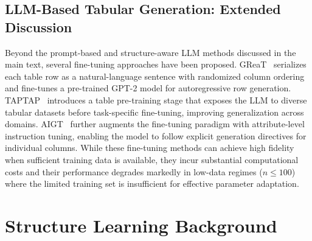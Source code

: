 \subsection{LLM-Based Tabular Generation: Extended Discussion}
Beyond the prompt-based and structure-aware LLM methods discussed in the main text, several fine-tuning approaches have been proposed. GReaT~\cite{borisov2023language} serializes each table row as a natural-language sentence with randomized column ordering and fine-tunes a pre-trained GPT-2 model for autoregressive row generation. TAPTAP~\cite{zhang2023generative} introduces a table pre-training stage that exposes the LLM to diverse tabular datasets before task-specific fine-tuning, improving generalization across domains. AIGT~\cite{zhang2025aigt} further augments the fine-tuning paradigm with attribute-level instruction tuning, enabling the model to follow explicit generation directives for individual columns. While these fine-tuning methods can achieve high fidelity when sufficient training data is available, they incur substantial computational costs and their performance degrades markedly in low-data regimes ($n \le 100$) where the limited training set is insufficient for effective parameter adaptation.

\section{Structure Learning Background}
\label{app:structure_learning_background}

